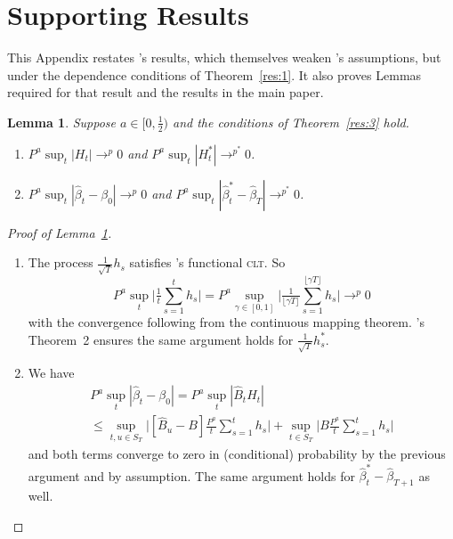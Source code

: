 \documentclass[11pt,fleqn]{article}
\newcommand\citepos[2][]{\citeauthor{#2}'s \citeyearpar[#1]{#2}}
\newtheorem{lema}{Lemma}[section]
\theoremstyle{definition}
\newcommand{\clt}{\textsc{clt}}
\begin{document}
\section{Supporting Results}
This Appendix restates \citepos{Mcc:00} results, which themselves
weaken \citepos{Wes:96} assumptions, but under the dependence
conditions of Theorem~\ref{res:1}.  It also proves Lemmas required for
that result and the results in the main paper.

\begin{lema}\label{res:a2}
  Suppose $a \in [0,\frac12)$ and the conditions of Theorem~\ref{res:3}
  hold.
  \begin{enumerate}
  \item $P^a \sup_t | H_{t} | \to^p 0$ and $P^a \sup_t | H_{t}^{*} |
    \to^{p^{*}} 0$.
  \item $P^a \sup_t | \hat{\beta}_{t} - \beta_{0} | \to^{p} 0$ and
    $P^a \sup_t | \hat{\beta}^{*}_{t} - \hat{\beta}_T |
    \to^{p^{*}} 0$.
  \end{enumerate}
\end{lema}

\begin{proof}[Proof of Lemma~\ref{res:a2}] \quad
  \begin{enumerate}
  \item The process $\tfrac{1}{\sqrt{T}} h_{s}$ satisfies \citepos[Theorem
    3.1]{JoD:00b} functional \clt.  So
    \begin{equation}
      P^a \sup_t \Big| \tfrac1t \sum_{s=1}^t h_{s} \Big| =
      P^a \sup_{\gamma \in [0,1]} \Big| \tfrac{1}{\lfloor \gamma
        T\rfloor} \sum_{s=1}^{\lfloor \gamma T \rfloor} h_{s} \Big| \to^{p} 0
    \end{equation}
    with the convergence following from the continuous mapping
    theorem.  \citepos{Cal:11d} Theorem~2 ensures the same argument
    holds for $\tfrac{1}{\sqrt{T}} h_s^{*}$.
  \item We have
    \begin{multline}
      P^a \sup_t | \hat{\beta}_t - \beta_0 | = P^a \sup_t |\hat{B}_{t}
      H_{t}| \\ \leq \sup_{t,u \in S_T} \Big| [ \hat{B}_u - B]
      \tfrac{P^a}{t} \sum_{s=1}^t h_{s} \Big| + \sup_{t\in S_T} \Big|
      B \tfrac{P^a}{t} \sum_{s=1}^t h_{s} \Big|
    \end{multline}
    and both terms converge to zero in (conditional) probability by
    the previous argument and by assumption.  The same argument holds
    for $\hat{\beta}_t^{*} - \hat{\beta}_{T+1}$ as well.
  \end{enumerate}
\end{proof}
\end{document}
